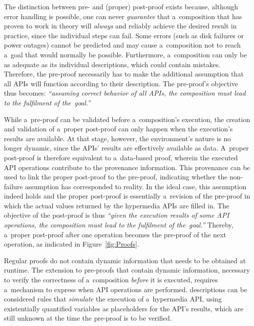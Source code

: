 The distinction between pre- and  (proper) post-proof exists because,
although error handling is possible,
one can never \emph{guarantee} that a~composition that has proven to work in theory
will \emph{always} and reliably achieve the desired result in practice,
since the individual steps can fail.
Some errors (such as disk failures or power outages) cannot be predicted
and may cause a~composition not to reach a~goal that would normally be possible.
Furthermore, a~composition can only be as adequate
as its individual descriptions, which could contain mistakes.
Therefore, the pre-proof necessarily has to make the additional assumption
that all APIs will function according to their description.
The pre-proof's objective thus becomes:
\emph{``assuming correct behavior of all APIs,
      the composition must lead to the fulfilment of the~goal.''}

While a~pre-proof can be validated before a~composition's execution,
the creation and validation of a~proper post-proof can only happen
when the execution's results are available.
At that stage, however, the environment's nature is no longer dynamic,
since the APIs' results are effectively available as data.
A~proper post-proof is therefore equivalent to a~data-based proof,
wherein the executed API operations contribute to the provenance information.
This provenance can be used to link the proper post-proof to the pre-proof,
indicating whether the non-failure assumption has corresponded to reality.
In the ideal case, this assumption indeed holds
and the proper post-proof is essentially a~revision of the pre-proof
in which the actual values returned by the hypermedia APIs are filled in.
The objective of the post-proof is thus
\emph{``given the execution results of some API operations,
      the composition must lead to the fulfilment of the~goal.''}
Thereby, a~proper post-proof after one operation
becomes the pre-proof of the next operation,
as indicated in Figure~\ref{fig:Proofs}.

Regular proofs do not contain dynamic information that needs to be obtained at runtime.
The extension to pre-proofs that contain dynamic information,
necessary to verify the correctness of a~composition \emph{before} it is executed,
requires a~mechanism to express when API operations are performed.
\restdesc descriptions can be considered rules
that \emph{simulate} the execution of a~hypermedia API,
using existentially quantified variables as placeholders for the API's results,
which are still unknown at the time the pre-proof is to be verified.

